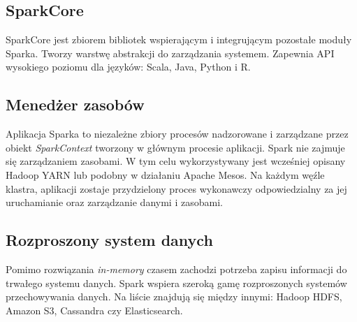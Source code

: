 \documentclass{pracamgr}
\begin{document}
\subsection{SparkCore}
SparkCore jest zbiorem bibliotek wspierającym i integrującym pozostałe moduły Sparka. Tworzy warstwę abstrakcji do zarządzania systemem. Zapewnia API wysokiego poziomu dla języków: Scala, Java, Python i R.

\subsection{Menedżer zasobów}
Aplikacja Sparka to niezależne zbiory procesów nadzorowane i zarządzane przez obiekt \textit{SparkContext} tworzony w głównym procesie aplikacji. Spark nie zajmuje się zarządzaniem zasobami. W tym celu wykorzystywany jest wcześniej opisany Hadoop YARN lub podobny w działaniu Apache Mesos. Na każdym węźle klastra, aplikacji zostaje przydzielony proces wykonawczy odpowiedzialny za jej uruchamianie oraz zarządzanie danymi i zasobami.

\subsection{Rozproszony system danych}
Pomimo rozwiązania \textit{in-memory} czasem zachodzi potrzeba zapisu informacji do trwałego systemu danych. Spark wspiera szeroką gamę rozproszonych systemów przechowywania danych. Na liście znajdują się między innymi: Hadoop HDFS, Amazon S3, Cassandra czy Elasticsearch.
\end{document}
